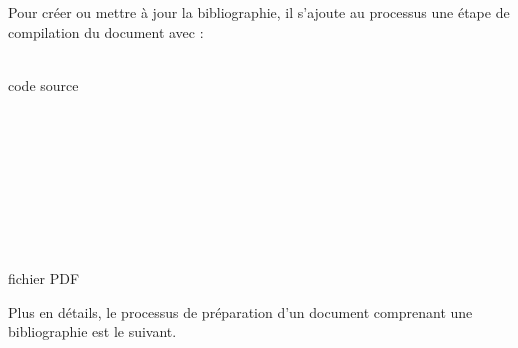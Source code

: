 Pour créer ou mettre à jour la bibliographie, il s'ajoute au processus
une étape de compilation du document avec {\BibTeX}:
\begin{center}
  \sffamily
  \begin{minipage}[t]{0.12\linewidth}
    \centering
    {\LARGE\faFileTextO} \\ \medskip
    code source
  \end{minipage}
  \quad\faArrowRight\quad
  \begin{minipage}[t]{0.12\linewidth}
    \centering
    {\LARGE\faCogs} \\ \medskip
     \\ 
  \end{minipage}
  \quad\faArrowRight\quad
  \begin{minipage}[t]{0.12\linewidth}
    \centering
    {\LARGE\faCogs} \\ \medskip
  \end{minipage}
  \quad\faArrowRight\quad
  \begin{minipage}[t]{0.12\linewidth}
    \centering
    {\LARGE\faCogs}\;
     \\ \medskip
     \\ 
  \end{minipage}
  \quad\faArrowRight\quad
  \begin{minipage}[t]{0.12\linewidth}
    \centering
    {\LARGE\faFilePdfO} \\ \medskip
    fichier PDF
  \end{minipage}
\end{center}

Plus en détails, le processus de préparation d'un document comprenant
une bibliographie est le suivant.

